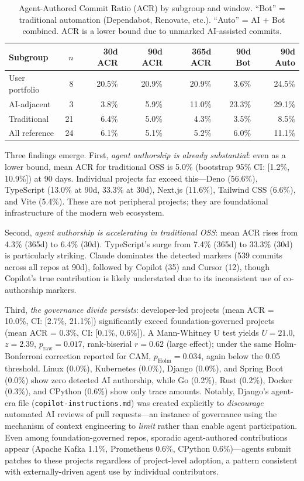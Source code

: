 \documentclass[12pt]{article}
\begin{document}
\begin{table}[ht]
\centering
\small
\begin{tabularx}{\textwidth}{lrrrrrr}
\toprule
\textbf{Subgroup} & \textbf{$n$} & \textbf{30d ACR} & \textbf{90d ACR} & \textbf{365d ACR} & \textbf{90d Bot} & \textbf{90d Auto} \\
\midrule
User portfolio & 8 & 20.5\% & 20.9\% & 20.9\% & 3.6\% & 24.5\% \\
AI-adjacent & 3 & 3.8\% & 5.9\% & 11.0\% & 23.3\% & 29.1\% \\
Traditional & 21 & 6.4\% & 5.0\% & 4.3\% & 3.5\% & 8.5\% \\
\midrule
All reference & 24 & 6.1\% & 5.1\% & 5.2\% & 6.0\% & 11.1\% \\
\bottomrule
\end{tabularx}
\caption{Agent-Authored Commit Ratio (ACR) by subgroup and window. ``Bot'' = traditional automation (Dependabot, Renovate, etc.). ``Auto'' = AI + Bot combined. ACR is a lower bound due to unmarked AI-assisted commits.}
\label{tab:acr}
\end{table}

Three findings emerge. First, \textit{agent authorship is already substantial}: even as a lower bound, mean ACR for traditional OSS is 5.0\% (bootstrap 95\% CI: [1.2\%, 10.9\%]) at 90 days. Individual projects far exceed this---Deno (56.6\%), TypeScript (13.0\% at 90d, 33.3\% at 30d), Next.js (11.6\%), Tailwind CSS (6.6\%), and Vite (5.4\%). These are not peripheral projects; they are foundational infrastructure of the modern web ecosystem.

Second, \textit{agent authorship is accelerating in traditional OSS}: mean ACR rises from 4.3\% (365d) to 6.4\% (30d). TypeScript's surge from 7.4\% (365d) to 33.3\% (30d) is particularly striking. Claude dominates the detected markers (539 commits across all repos at 90d), followed by Copilot (35) and Cursor (12), though Copilot's true contribution is likely understated due to its inconsistent use of co-authorship markers.

Third, \textit{the governance divide persists}: developer-led projects (mean ACR = 10.0\%, CI: [2.7\%, 21.1\%]) significantly exceed foundation-governed projects (mean ACR = 0.3\%, CI: [0.1\%, 0.6\%]). A Mann-Whitney U test yields $U=21.0$, $z=2.39$, $p_\text{raw}=0.017$, rank-biserial $r=0.62$ (large effect); under the same Holm-Bonferroni correction reported for CAM, $p_\text{Holm}=0.034$, again below the 0.05 threshold. Linux (0.0\%), Kubernetes (0.0\%), Django (0.0\%), and Spring Boot (0.0\%) show zero detected AI authorship, while Go (0.2\%), Rust (0.2\%), Docker (0.3\%), and CPython (0.6\%) show only trace amounts. Notably, Django's agent-era file (\texttt{copilot-instructions.md}) was created explicitly to \textit{discourage} automated AI reviews of pull requests---an instance of governance using the mechanism of context engineering to \textit{limit} rather than enable agent participation. Even among foundation-governed repos, sporadic agent-authored contributions appear (Apache Kafka 1.1\%, Prometheus 0.6\%, CPython 0.6\%)---agents submit patches to these projects regardless of project-level adoption, a pattern consistent with externally-driven agent use by individual contributors.
\end{document}
